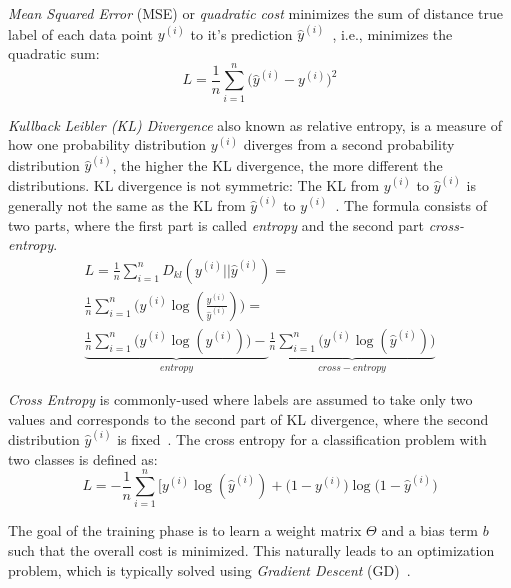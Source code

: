 \begin{inparaenum}
\item \emph{Mean Squared Error} (MSE) or \emph{quadratic cost} minimizes the sum of distance true label of each data point $y^{ (i) }$ to it's prediction $\hat { y } ^{ (i) }$~, i.e., minimizes the quadratic sum: 
\begin{equation}
L=\frac { 1 }{ n } \sum _{ i=1 }^{ n }{ (\hat { y } ^{ (i) }- } y^{ (i) })^{ 2 }
\end{equation}
\item \emph{Kullback Leibler (KL) Divergence} also known as relative entropy, is a measure of how one probability distribution $y^{ (i) }$ diverges from a second probability distribution $\hat { y } ^{ (i) }$, the higher the KL divergence, the more different the distributions. KL divergence is not symmetric: The KL from $y^{ (i) }$ to $\hat { y } ^{ (i) }$ is generally not the same as the KL from $\hat { y } ^{ (i) }$ to $y^{ (i) }$~. The formula consists of two parts, where the first part is called \emph{entropy} and the second part \emph{cross-entropy}.
\begin{equation}
\begin{split}
L=\frac { 1 }{ n } \sum _{ i=1 }^{ n }{ D_{ kl }(y^{ (i) }||\hat { y } ^{ (i) }) } =\\
 \frac { 1 }{ n } \sum _{ i=1 }^{ n }{ (y^{ (i) }\log{(\frac { y^{ (i) } }{ \hat { y } ^{ (i) } } )) }} =\\
 \underbrace { \frac { 1 }{ n } \sum _{ i=1 }^{ n }{ (y^{ (i) }\log{(y^{ (i) })) }} - }_{ entropy } \underbrace { \frac { 1 }{ n } \sum _{ i=1 }^{ n }{ (y^{ (i) }\log{(\hat { y } ^{ (i) })) }}  }_{ cross-entropy } 
 \end{split}
\end{equation}
\item \emph{Cross Entropy} is commonly-used where labels are assumed to take only two values and corresponds to the second part of KL divergence, where the second distribution $\hat { y } ^{ (i) }$ is fixed~. The cross entropy for a classification problem with two classes is defined as:  
\begin{equation}
L=-\frac { 1 }{ n } \sum _{ i=1 }^{ n }{ [y^{ (i) }\log{(\hat { y } ^{ (i) })+(1-  y^{ (i) }}})\log{(1-\hat { y } ^{ (i) }})
\end{equation}
\end{inparaenum}
The goal of the training phase is to learn a weight matrix $\Theta$ and a bias term $b$ such that the overall cost is minimized. This naturally leads to an optimization problem, which is  typically solved using \emph{Gradient Descent} (GD)~.
